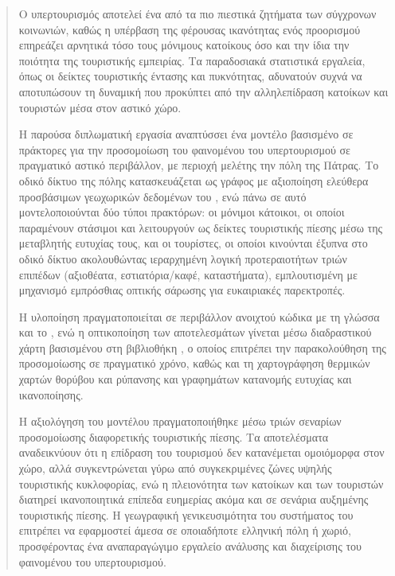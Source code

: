 \begin{abstract}
Ο υπερτουρισμός αποτελεί ένα από τα πιο πιεστικά ζητήματα των σύγχρονων
κοινωνιών, καθώς η υπέρβαση της φέρουσας ικανότητας ενός προορισμού
επηρεάζει αρνητικά τόσο τους μόνιμους κατοίκους όσο και την ίδια την
ποιότητα της τουριστικής εμπειρίας. Τα παραδοσιακά στατιστικά εργαλεία,
όπως οι δείκτες τουριστικής έντασης και πυκνότητας, αδυνατούν συχνά να
αποτυπώσουν τη δυναμική που προκύπτει από την αλληλεπίδραση κατοίκων και
τουριστών μέσα στον αστικό χώρο.

Η παρούσα διπλωματική εργασία αναπτύσσει ένα μοντέλο βασισμένο σε πράκτορες
 για την προσομοίωση του φαινομένου του υπερτουρισμού
σε πραγματικό αστικό περιβάλλον, με περιοχή μελέτης την πόλη της Πάτρας.
Το οδικό δίκτυο της πόλης κατασκευάζεται ως γράφος με αξιοποίηση ελεύθερα
προσβάσιμων γεωχωρικών δεδομένων του , ενώ πάνω σε αυτό
μοντελοποιούνται δύο τύποι πρακτόρων: οι μόνιμοι κάτοικοι, οι οποίοι
παραμένουν στάσιμοι και λειτουργούν ως δείκτες τουριστικής πίεσης μέσω της
μεταβλητής ευτυχίας τους, και οι τουρίστες, οι οποίοι κινούνται έξυπνα στο
οδικό δίκτυο ακολουθώντας ιεραρχημένη λογική προτεραιοτήτων τριών επιπέδων
(αξιοθέατα, εστιατόρια/καφέ, καταστήματα), εμπλουτισμένη με μηχανισμό
εμπρόσθιας οπτικής σάρωσης για ευκαιριακές παρεκτροπές.

Η υλοποίηση πραγματοποιείται σε περιβάλλον ανοιχτού κώδικα με τη γλώσσα
 και το , ενώ η οπτικοποίηση των αποτελεσμάτων
γίνεται μέσω διαδραστικού  χάρτη βασισμένου στη βιβλιοθήκη
, ο οποίος επιτρέπει την παρακολούθηση της προσομοίωσης σε
πραγματικό χρόνο, καθώς και τη χαρτογράφηση θερμικών χαρτών θορύβου και
ρύπανσης και γραφημάτων κατανομής ευτυχίας και ικανοποίησης.

Η αξιολόγηση του μοντέλου πραγματοποιήθηκε μέσω τριών σεναρίων προσομοίωσης
διαφορετικής τουριστικής πίεσης. Τα αποτελέσματα αναδεικνύουν ότι η επίδραση
του τουρισμού δεν κατανέμεται ομοιόμορφα στον χώρο, αλλά συγκεντρώνεται γύρω
από συγκεκριμένες ζώνες υψηλής τουριστικής κυκλοφορίας, ενώ η πλειονότητα των
κατοίκων και των τουριστών διατηρεί ικανοποιητικά επίπεδα ευημερίας ακόμα και
σε σενάρια αυξημένης τουριστικής πίεσης. Η γεωγραφική γενικευσιμότητα του
συστήματος του επιτρέπει να εφαρμοστεί άμεσα σε οποιαδήποτε ελληνική πόλη ή
χωριό, προσφέροντας ένα αναπαραγώγιμο εργαλείο ανάλυσης και διαχείρισης του
φαινομένου του υπερτουρισμού.
\end{abstract}

